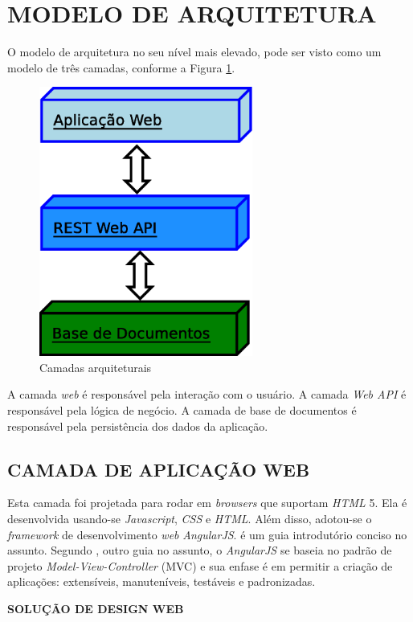 \section[MODELO DE ARQUITETURA]{MODELO DE ARQUITETURA}

O modelo de arquitetura no seu nível mais elevado, pode ser visto como um modelo de três camadas, conforme a Figura \ref{camadas_arquitetura}.
\begin{figure}[ht]
	\centering
	\includegraphics[width=7cm]{figuras/camadas.eps}
	\caption{Camadas arquiteturais}
	\label{camadas_arquitetura}
\end{figure}

A camada \emph{web} é responsável pela interação com o usuário. 
A camada \emph{Web API} é responsável pela lógica de negócio. 
A camada de base de documentos é responsável pela persistência dos dados da aplicação.


\subsection[CAMADA DE APLICAÇÃO WEB] {CAMADA DE APLICAÇÃO WEB}
Esta camada foi projetada para rodar em \emph{browsers} que suportam \emph{HTML} 5. 
Ela é desenvolvida usando-se \emph{Javascript}, \emph{CSS} e \emph{HTML}. Além disso, adotou-se o \emph{framework} de desenvolvimento \emph{web} \emph{AngularJS}. \cite{Branas2014} é um guia introdutório conciso no assunto. 
Segundo \cite{Freeman2014}, outro guia no assunto, o \emph{AngularJS} se baseia no padrão de projeto \emph{Model-View-Controller} (MVC) e sua enfase é em permitir a criação de aplicações: extensíveis, manuteníveis, testáveis e padronizadas.

\textbf{SOLUÇÃO DE DESIGN WEB}

